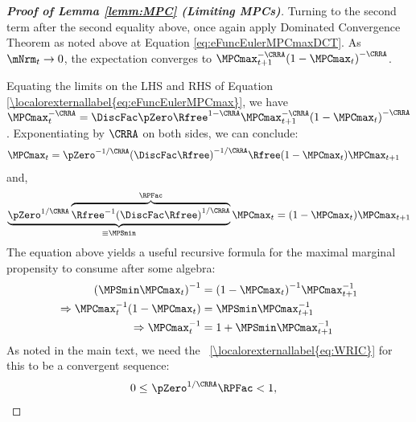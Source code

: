 \documentclass[\econtexRoot/BufferStockTheory]{subfiles}
\begin{document}
\begin{proof}[\textbf{Proof of Lemma \ref{lemm:MPC} (Limiting MPCs)}]
Turning to the second term after the second equality above, once again apply Dominated Convergence Theorem as noted above at Equation \eqref{eq:eFuncEulerMPCmaxDCT}. As $\mNrm_{t} \rightarrow 0$, 
the expectation converges to $\MPCmax _{t+1}^{-\CRRA
}{(1-\MPCmax _{t})}^{-\CRRA }$. 

Equating the limits on the LHS and RHS of Equation \eqref{\localorexternallabel{eq:eFuncEulerMPCmax}}, we have $\MPCmax_{t}^{-\CRRA }=\DiscFac
\pZero\Rfree^{1-\CRRA }\MPCmax_{t+1}^{-\CRRA }{(1-\MPCmax
_{t})}^{-\CRRA }$. Exponentiating by $\CRRA$ on both sides, we can conclude:
%
%
\begin{equation}\begin{gathered}\begin{aligned}
\MPCmax_{t} & = \pZero^{-1/\CRRA} {(\DiscFac
\Rfree)}^{-1/\CRRA}\Rfree(1-\MPCmax _{t})\MPCmax _{t+1} \notag
\end{aligned}\end{gathered}\end{equation}
%
%
and, 
%
%
\begin{equation}
 \underbrace{\pZero^{1/\CRRA}\overbrace{{\Rfree}^{-1}{(\DiscFac
    \Rfree)}^{1/\CRRA}}^{\RPFac}}_{\equiv \MPSmin} \MPCmax_{t}  = (1-\MPCmax _{t})\MPCmax _{t+1} \label{eq:MPSminDef}
\end{equation}
%
%
The equation above yields a useful recursive formula for the maximal marginal propensity to consume after some algebra:
%
%
\begin{equation}\begin{gathered}\begin{aligned}
  {(\MPSmin \MPCmax_{t})}^{-1}  & = {(1-\MPCmax_{t})}^{-1}\MPCmax_{t+1}^{-1}  \notag
\\ \Rightarrow \MPCmax_{t}^{-1}(1-\MPCmax_{t})  & = \MPSmin \MPCmax_{t+1}^{-1}   \notag
\\ \Rightarrow  \MPCmax_{t}^{-1}  & = 1+\MPSmin \MPCmax_{t+1}^{-1} \label{eq:MPCmaxInvApndx}
\end{aligned}\end{gathered}\end{equation}
%
%
As noted in the main text, we need the \WRIC~\eqref{\localorexternallabel{eq:WRIC}} for this to be a convergent sequence:
\begin{equation}\begin{gathered}\begin{aligned}
  0 \leq & ~\pZero^{1/\CRRA} \RPFac < 1 \label{eq:WRICapndx},
\end{aligned}\end{gathered}\end{equation}


\end{proof}
\end{document}

